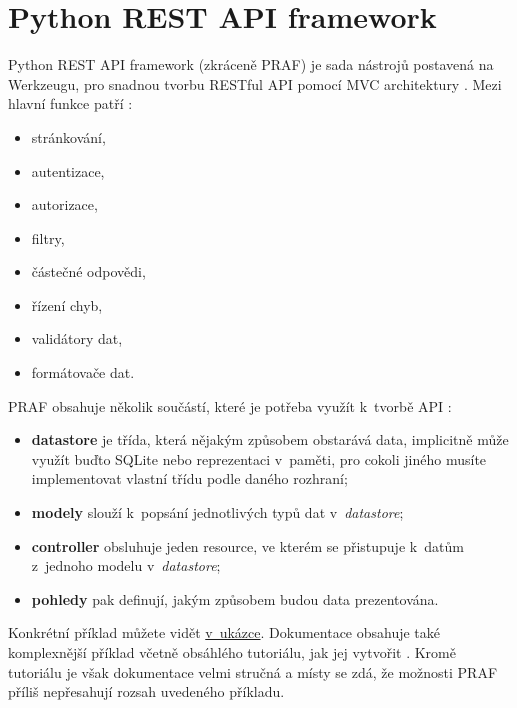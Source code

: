 \section{Python REST API framework}\label{python-rest-api-framework}

Python REST API framework (zkráceně PRAF) je sada nástrojů postavená na Werkzeugu, pro snadnou tvorbu RESTful API pomocí MVC architektury \autocite{praf}. Mezi hlavní funkce patří \autocite{praf}:

\begin{itemize}
\tightlist
\item
  stránkování,
\item
  autentizace,
\item
  autorizace,
\item
  filtry,
\item
  částečné odpovědi,
\item
  řízení chyb,
\item
  validátory dat,
\item
  formátovače dat.
\end{itemize}

PRAF obsahuje několik součástí, které je potřeba využít k~tvorbě API \autocite{prafarch}:

\begin{itemize}
\tightlist
\item
  \textbf{datastore} je třída, která nějakým způsobem obstarává data, implicitně může využít buďto SQLite nebo reprezentaci v~paměti, pro cokoli jiného musíte implementovat vlastní třídu podle daného rozhraní;
\item
  \textbf{modely} slouží k~popsání jednotlivých typů dat v~\emph{datastore};
\item
  \textbf{controller} obsluhuje jeden resource, ve kterém se přistupuje k~datům z~jednoho modelu v~\emph{datastore};
\item
  \textbf{pohledy} pak definují, jakým způsobem budou data prezentována.
\end{itemize}

Konkrétní příklad můžete vidět \protect\hyperlink{code:praf}{v~ukázce}. Dokumentace obsahuje také komplexnější příklad včetně obsáhlého tutoriálu, jak jej vytvořit \autocite{praftuto}. Kromě tutoriálu je však dokumentace velmi stručná a místy se zdá, že možnosti PRAF příliš nepřesahují rozsah uvedeného příkladu.

